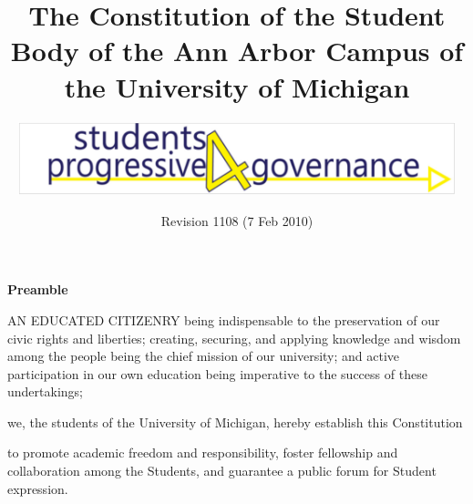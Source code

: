 \documentclass{constitution}
\begin{document}
	\title{The Constitution of the Student Body of the Ann Arbor Campus of the University of Michigan}
	\author{\includegraphics[width=5in]{S4PGlogo}}
	\date{Revision 1108 (7 Feb 2010)}
	\maketitle
	\tableofcontents
	\newpage

	\pagestyle{fancy}
	\headheight 35pt
	\linenumbers
	
	\begin{center}
		\bfseries Preamble
	\end{center}

	AN EDUCATED CITIZENRY being indispensable to the preservation of our civic rights and liberties; creating, securing, and applying knowledge and wisdom among the people being the chief mission of our university; and active participation in our own education being imperative to the success of these undertakings;

		we, the students of the University of Michigan, hereby establish this Constitution

	to promote academic freedom and responsibility, foster fellowship and collaboration among the Students, and guarantee a public forum for Student expression.
	

	

	
	
	
	
	
	
	
	
	
	

	
	
	
\end{document}
